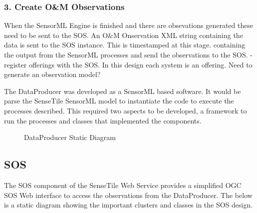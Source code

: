 \documentclass[]{final_report}
\begin{document}
\subsubsection {3. Create O\&M Observations}

When the SensorML Engine is finished
and there are obsevations generated these
need to be sent to the SOS. An O\&M Onservation
XML string containing the data is sent to
the SOS instance. This is timestamped at
this stage.
 containing the output from
the SensorML processes and send the observations
to the SOS.
-register offerings with the SOS. In this design
each system is an offering.
Need to generate an observation model?


The DataProducer was developed as a SensorML based software. It would be parse the SenseTile SensorML model to instantiate the code to execute the processes described. This required two aspects to be developed, a framework to run the processes and classes that implemented the components.

\begin{figure}[h]
\centering
{}
\caption{DataProducer Static Diagram}\label{fig:bon_static_diagam_producer.png}
\end{figure}


\newpage
\subsection {SOS}

The SOS component of the SenseTile Web Service provides a simplified OGC SOS Web interface to access the observations from the DataProducer. The below is a static diagram showing the important clusters and classes in the SOS design.
\end{document}

